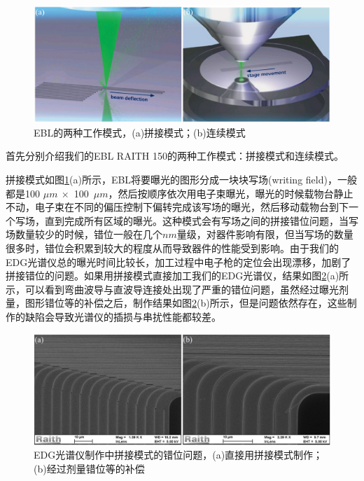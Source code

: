 \begin{figure}[htb]
	\centering
	\includegraphics[width=15cm]{./Pictures/edg_pattern_mode.jpg}
	\captionsetup{justification=centering}
	\caption{EBL的两种工作模式，(a)拼接模式；(b)连续模式\cite{piaszenskicontinuous}}
	\label{edg_pattern_mode}
\end{figure}

首先分别介绍我们的EBL RAITH 150的两种工作模式：拼接模式和连续模式\cite{piaszenskicontinuous}。

拼接模式如图\ref{edg_pattern_mode}(a)所示，EBL将要曝光的图形分成一块块写场(writing field)，一般都是100 $\mu m~\times$ 100~$\mu m $，然后按顺序依次用电子束曝光，曝光的时候载物台静止不动，电子束在不同的偏压控制下偏转完成该写场的曝光，然后移动载物台到下一个写场，直到完成所有区域的曝光。这种模式会有写场之间的拼接错位问题，当写场数量较少的时候，错位一般在几个$nm$量级，对器件影响有限，但当写场的数量很多时，错位会积累到较大的程度从而导致器件的性能受到影响。由于我们的EDG光谱仪总的曝光时间比较长，加工过程中电子枪的定位会出现漂移，加剧了拼接错位的问题。如果用拼接模式直接加工我们的EDG光谱仪，结果如图\ref{edg_misalignment}(a)所示，可以看到弯曲波导与直波导连接处出现了严重的错位问题，虽然经过曝光剂量，图形错位等的补偿之后，制作结果如图\ref{edg_misalignment}(b)所示，但是问题依然存在，这些制作的缺陷会导致光谱仪的插损与串扰性能都较差。

\begin{figure}[htb]
	\centering
	\includegraphics[width=15cm]{./Pictures/edg_misalignment.jpg}
	\captionsetup{justification=centering}
	\caption{EDG光谱仪制作中拼接模式的错位问题，(a)直接用拼接模式制作；(b)经过剂量错位等的补偿}
	\label{edg_misalignment}
\end{figure}

